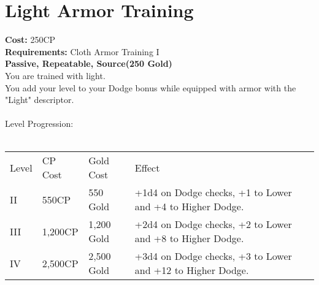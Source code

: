 \section{Light Armor Training}\label{perk:lightArmorTraining}
\textbf{Cost:} 250CP\\
\textbf{Requirements:} Cloth Armor Training I\\
\textbf{Passive, Repeatable, Source(250 Gold)}\\
You are trained with light.\\
You add your level to your Dodge bonus while equipped with armor with the "Light" descriptor.\\
\\

Level Progression:\\
\\
\begin{tabular}{l | l | l | l}
	Level & CP Cost & Gold Cost & Effect\\
	II & 550CP & 550 Gold & +1d4 on Dodge checks, +1 to Lower and +4 to Higher Dodge.\\
	III & 1,200CP & 1,200 Gold & +2d4 on Dodge checks, +2 to Lower and +8 to Higher Dodge.\\
	IV & 2,500CP & 2,500 Gold & +3d4 on Dodge checks, +3 to Lower and +12 to Higher Dodge.\\
\end{tabular}
